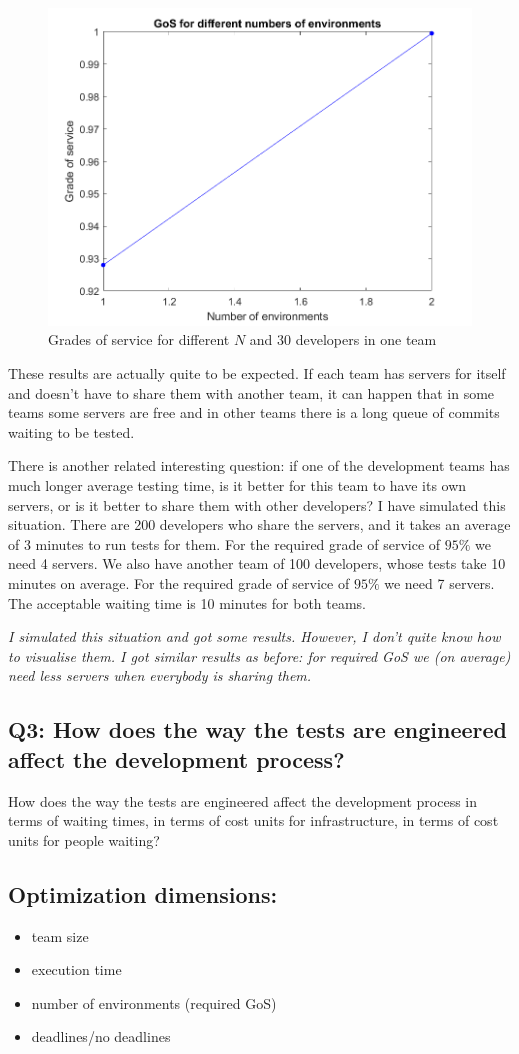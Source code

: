 \documentclass[a4paper]{article}
\begin{document}
\begin{figure}[h!]
\includegraphics[scale=0.7]{plots/Grade_of_service_30x10_developers.png}
\caption{Grades of service for different $N$ and 30 developers in one team}
\label{30_one_team}
\end{figure} 

\noindent These results are actually quite to be expected. If each team has servers for itself and doesn't have to share them with another team, it can happen that in some teams some servers are free and in other teams there is a long queue of commits waiting to be tested.

\noindent There is another related interesting question: if one of the development teams has much longer average testing time, is it better for this team to have its own servers, or is it better to share them with other developers?
I have simulated this situation. There are 200 developers who share the servers, and it takes an average of 3 minutes to run tests for them. For the required grade of service of $95\%$ we need 4 servers. 
\newline We also have another team of 100 developers, whose tests take 10 minutes on average. For the required grade of service of $95\%$ we need 7 servers. The acceptable waiting time is 10 minutes for both teams. 

\textit{I simulated this situation and got some results. However, I don't quite know how to visualise them. I got similar results as before: for required GoS we (on average) need less servers when everybody is sharing them. }

\subsection{Q3: How does the way the tests are engineered affect the development process?}
How does the way the tests are engineered affect the development process in terms of waiting times, in terms of cost units for infrastructure, in terms of cost units for people waiting?


\subsection{Optimization dimensions:}
\begin{itemize}
\item team size
\item execution time
\item number of environments (required GoS)
\item deadlines/no deadlines

\end{itemize}
\end{document}
